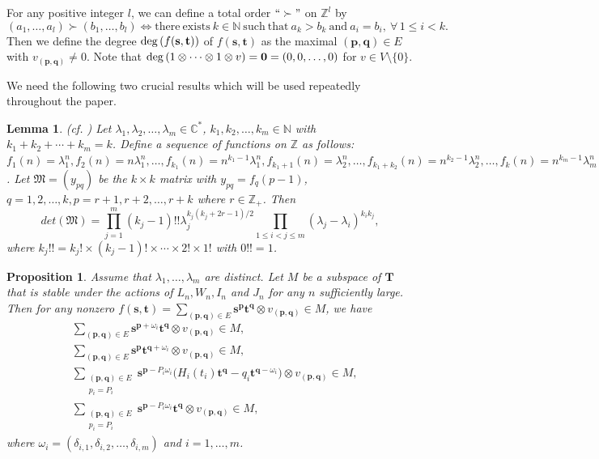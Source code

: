 \documentclass[12pt,leqno,amscd,amsfonts,amssymb]{amsart}
\def\Z{\mathbb{Z}}
\def\N{\mathbb{N}}
\def\C{\mathbb{C}}
\numberwithin{equation}{section}
\newtheorem{lemm}[theo]{Lemma}
\newtheorem{prop}[theo]{Proposition}
\begin{document}
For any positive integer $l$,  we can define a total order $``\succ"$ on $\Z^l$ by
$$(a_1, \ldots, a_l) \succ (b_1, \ldots, b_l) \Longleftrightarrow  \mathrm{ there\ exists} \ k\in\N \ \mathrm{such \ that}  \ a_k>b_k \ \mathrm{and}\ a_{i}=b_{i},\ \forall\, 1\leq i<k.$$
Then we define the degree ${\rm deg\,}(f(\mathbf{s}, \mathbf{t}))$ of $f(\mathbf{s}, \mathbf{t})$ as the maximal $(\mathbf{p}, \mathbf{q})\in E$ with $v_{(\mathbf{p}, \mathbf{q})}\neq0$. Note that ${\rm deg\,}(1\otimes \cdots \otimes 1\otimes v)=\mathbf{0}=(0, 0,\ldots, 0)$ for $v\in V\setminus \{0\}$.	
	
We need the following two crucial results which will be used repeatedly throughout the paper.
\begin{lemm}\label{prop1}(cf. \cite{TZ2})
Let $\lambda_1, \lambda_2, \ldots, \lambda_m\in\C^*$,  $k_1, k_2, \ldots, k_m\in\N$ with $k_1+k_2+\cdots+k_m=k$. Define a sequence of functions on $\Z$ as follows: $f_1(n)=\lambda_1^n, f_2(n)=n\lambda_1^n, \ldots, f_{k_1}(n)=n^{k_1-1}\lambda_1^n, f_{k_1+1}(n)=\lambda_2^n, \ldots, f_{k_1+k_2}(n)=n^{k_2-1}\lambda_2^n, \ldots, f_{k}(n)=n^{k_m-1}\lambda_m^n$. Let $\mathfrak{M}=(y_{pq})$ be the $k\times k$ matrix with $y_{pq}=f_q(p-1)$, $q=1, 2, \ldots, k, p=r+1, r+2, \ldots, r+k$ where $r\in\Z_+$. Then
\begin{equation*}det(\mathfrak{M})=\prod_{j=1}^m(k_j-1)!!\lambda_j^{k_j(k_j+2r-1)/2}\prod_{1\leq i<j\leq m}(\lambda_j-\lambda_i)^{k_ik_j},\end{equation*}
where $k_j!!=k_j!\times (k_j-1)!\times\cdots \times 2!\times 1!$ with $0!!=1$.
	\end{lemm}
	\begin{prop}\label{prop2}
Assume that $\lambda_1, \ldots, \lambda_m$ are distinct.  Let $M$ be a subspace of $\bm{T}$ that is stable under the actions of $L_n, W_n, I_n$ and $J_n$ for any $n$ sufficiently large. Then for any nonzero $f(\mathbf{s}, \mathbf{t})=\sum_{(\mathbf{p}, \mathbf{q})\in E}\mathbf{s}^{\mathbf{p}}\mathbf{t}^{\mathbf{q}}\otimes v_{(\mathbf{p}, \mathbf{q})}\in M$,  we have
\begin{align}\label{111}&\sum_{(\mathbf{p}, \mathbf{q})\in E}\mathbf{s}^{\mathbf{p}+\omega_i}\mathbf{t}^{\mathbf{q}}\otimes v_{(\mathbf{p}, \mathbf{q})}\in M,\\
\label{222}&\sum_{(\mathbf{p}, \mathbf{q})\in E}\mathbf{s}^{\mathbf{p}}\mathbf{t}^{\mathbf{q}+\omega_i}\otimes v_{(\mathbf{p}, \mathbf{q})}\in M,\\
\label{333}&\sum_{\substack{(\mathbf{p}, \mathbf{q})\in E \\ p_i=P_i}}\mathbf{s}^{\mathbf{p}-P_i\omega_i}\big(H_i(t_i)\mathbf{t}^{\mathbf{q}}-q_i\mathbf{t}^{\mathbf{q}-\omega_i}\big)\otimes v_{(\mathbf{p}, \mathbf{q})}\in M,\\
\label{444}&\sum_{\substack{(\mathbf{p}, \mathbf{q})\in E \\ p_i=P_i}}\mathbf{s}^{\mathbf{p}-P_i\omega_i}\mathbf{t}^{\mathbf{q}}\otimes v_{(\mathbf{p}, \mathbf{q})}\in M,
\end{align}
where $\omega_i=(\delta_{i, 1}, \delta_{i, 2},\ldots, \delta_{i, m})$ and $i=1, \ldots, m$.
\end{prop}
\end{document}
